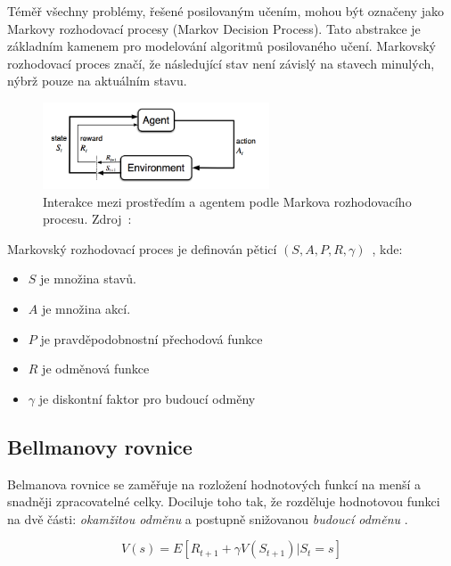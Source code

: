 Téměř všechny problémy, řešené posilovaným učením, mohou být označeny jako Markovy rozhodovací procesy (Markov Decision Process).
Tato abstrakce je základním kamenem pro modelování algoritmů posilovaného učení.
Markovský rozhodovací proces značí, že následující stav není závislý na stavech minulých, nýbrž pouze na aktuálním stavu.

\begin{figure}[H]
	\centering
	\includegraphics[width=0.6\textwidth]{obrazky-figures/RL_basics}
	\caption{Interakce mezi prostředím a agentem podle Markova rozhodovacího procesu.
  Zdroj~\cite{RL_basics}:}\label{fig:markov}
\end{figure}

\begin{definition}
  
Markovský rozhodovací proces je definován pěticí $(S, A, P, R, \gamma)$~\cite{RL_basics}, kde:

\begin{itemize}
\item $S$ je množina stavů.
\item $A$ je množina akcí.
\item $P$ je pravděpodobnostní přechodová funkce
\item $R$ je odměnová funkce
\item $\gamma$ je diskontní faktor pro budoucí odměny
\end{itemize}
\end{definition}

\subsection{Bellmanovy rovnice}\label{subsec:bellmanovy-rovnice}

Belmanova rovnice se zaměřuje na rozložení hodnotových funkcí na menší a snadněji zpracovatelné celky.
Dociluje toho tak, že rozděluje hodnotovou funkci na dvě části: \emph{okamžitou odměnu} a postupně snižovanou \emph{budoucí odměnu} \cite{Dynamic_Programming_BELLMAN}.

\begin{equation}
  V(s) = E[R_{t+1} + \gamma V(S_{t+1}) | S_t = s]\label{eq:bellman1}
\end{equation}

